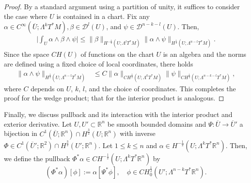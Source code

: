 \documentclass[12pt]{article}
\newcommand{\R}{\mathbb{R}}
\theoremstyle{plain}
\numberwithin{equation}{section}
\begin{document}
    \begin{proof}
        By a standard argument using a partition of unity, it suffices to consider the case where $U$ is contained in a chart. Fix any $\alpha \in C^\infty(\overline U; \Lambda^kT^*M), \beta \in \mathcal{D}^l(U)$, and $\psi \in \mathcal{D}^{n-k-l}(U)$. Then,
        \begin{align*}
            \Big| \int_{U} \alpha \wedge \beta \wedge \psi\Big| \leq \|\beta\|_{H^{-\frac12}(U;\Lambda^l T^*M)} \|\alpha\wedge \psi\|_{H^\frac12(U;\Lambda^{n-l}T^*M)}.
        \end{align*}
        Since the space $CH(U)$ of functions on the chart $U$ is an algebra and the norms are defined using a fixed choice of local coordinates, there holds
        \begin{align*}
            \|\alpha \wedge \psi\|_{H^\frac12(U;\Lambda^{n-l}T^*M)} 
            &\leq C\|\alpha\|_{CH^\frac12(U;\Lambda^k T^*M)}\|\psi\|_{CH^\frac12(U;\Lambda^{n-k-l}T^*M)},
        \end{align*}
        where $C$ depends on $U$, $k$, $l$, and the choice of coordinates. This completes the proof for the wedge product; that for the interior product is analogous.
    \end{proof}

    Finally, we discuss pullback and its interaction with the interior product and exterior derivative. Let $U, U' \subset \R^n$ be smooth bounded domains and $\Psi : \overline U \to \overline U'$ a bijection in $C^1(\overline U;\R^n) \cap H^\frac32(U;\R^n)$ with inverse $\Phi \in C^1(\overline U';\R^2) \cap H^\frac32(U';\R^n)$. Let $1 \leq k \leq n$ and $\alpha \in H^{-\frac12}(U;\Lambda^k T^*\R^n)$. Then, we define the pullback $\Phi^*\alpha \in CH^{-\frac12}(U;\Lambda^k T^*\R^n)$ by
        \begin{equation*}
            (\Phi^*\alpha) [ \phi ] := \alpha [\Psi^* \phi], \quad \phi \in CH^\frac12_0(U'; \Lambda^{n-k}T^*\R^n).
    \end{equation*}
\end{document}
